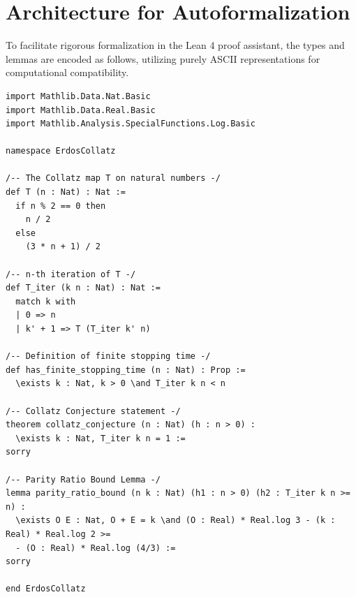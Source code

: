 \documentclass[12pt,a4paper]{article}
\begin{document}
\section{Architecture for Autoformalization}

To facilitate rigorous formalization in the Lean 4 proof assistant, the types and lemmas are encoded as follows, utilizing purely ASCII representations for computational compatibility.

\begin{verbatim}
import Mathlib.Data.Nat.Basic
import Mathlib.Data.Real.Basic
import Mathlib.Analysis.SpecialFunctions.Log.Basic

namespace ErdosCollatz

/-- The Collatz map T on natural numbers -/
def T (n : Nat) : Nat :=
  if n % 2 == 0 then
    n / 2
  else
    (3 * n + 1) / 2

/-- n-th iteration of T -/
def T_iter (k n : Nat) : Nat :=
  match k with
  | 0 => n
  | k' + 1 => T (T_iter k' n)

/-- Definition of finite stopping time -/
def has_finite_stopping_time (n : Nat) : Prop :=
  \exists k : Nat, k > 0 \and T_iter k n < n

/-- Collatz Conjecture statement -/
theorem collatz_conjecture (n : Nat) (h : n > 0) :
  \exists k : Nat, T_iter k n = 1 :=
sorry

/-- Parity Ratio Bound Lemma -/
lemma parity_ratio_bound (n k : Nat) (h1 : n > 0) (h2 : T_iter k n >= n) :
  \exists O E : Nat, O + E = k \and (O : Real) * Real.log 3 - (k : Real) * Real.log 2 >=
  - (O : Real) * Real.log (4/3) :=
sorry

end ErdosCollatz
\end{verbatim}
\end{document}
